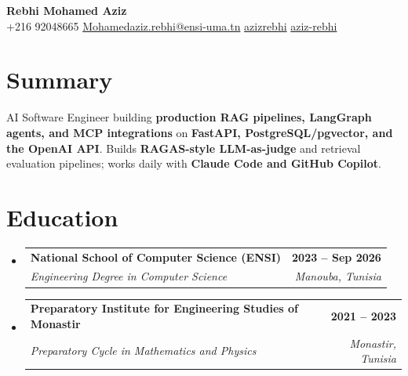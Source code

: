 \documentclass[letterpaper,9.5pt]{article}
\makeatletter
\newcommand{\resumeSubheading}[4]{
  \vspace{-3pt}\item
  \begin{tabular*}{1.0\textwidth}[t]{l@{\extracolsep{\fill}}r}
  \textbf{#1} & \textbf{\small #2} \\
  \textit{\small#3} & \textit{\small #4} \\
  \end{tabular*}\vspace{-7pt}
}
\makeatother
\begin{document}
\begin{center}
    \textbf{\Huge Rebhi Mohamed Aziz} \\[4pt]
    \small
    +216 92048665 \quad
    \href{mailto:Mohamedaziz.rebhi@ensi-uma.tn}{Mohamedaziz.rebhi@ensi-uma.tn} \quad
    \href{https://github.com/azizrebhi}{azizrebhi} \quad
    \href{https://linkedin.com/in/aziz-rebhi-971b32192/}{aziz-rebhi}
\end{center}

\section{Summary}
AI Software Engineer building \textbf{production RAG pipelines, LangGraph
agents, and MCP integrations} on \textbf{FastAPI, PostgreSQL/pgvector, and
the OpenAI API}. Builds \textbf{RAGAS-style LLM-as-judge} and retrieval
evaluation pipelines; works daily with \textbf{Claude Code and GitHub
Copilot}.

\section{Education}
\begin{itemize}[leftmargin=0.15in, label={}]
    \resumeSubheading
        {National School of Computer Science (ENSI)}{2023 -- Sep 2026}
        {Engineering Degree in Computer Science}{Manouba, Tunisia}
    \resumeSubheading
        {Preparatory Institute for Engineering Studies of Monastir}{2021 -- 2023}
        {Preparatory Cycle in Mathematics and Physics}{Monastir, Tunisia}
\end{itemize}

\end{document}
